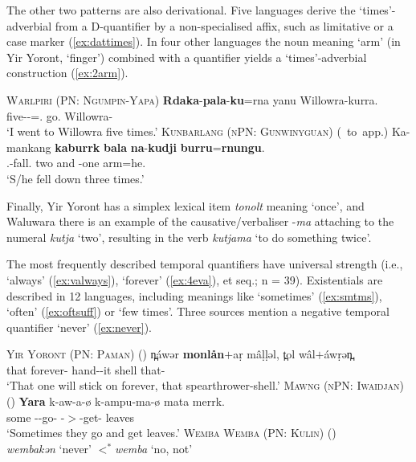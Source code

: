 \documentclass[12pt,egregdoesnotlikesansseriftitles]{scrartcl}
\begin{document}
  The other two patterns are also derivational. Five languages derive the `times'-adverbial from a D-quantifier by a non-specialised affix, such as limitative or a case marker (\ref{ex:dattimes}). In four other languages %
the noun meaning `arm' (in Yir Yoront, `finger') combined with a quantifier %
yields a `times'-adverbial construction (\ref{ex:2arm}).
  
  
  \begin{exe}
  \ex\label{ex:dattimes} \textsc{Warlpiri (PN: Ngumpin-Yapa)}\hfill {}
  \gll \textbf{Rdaka}-\textbf{pala}-\textbf{ku}=rna yanu Willowra-kurra.\\
  five-\Card-\Dat=\Fsg.\Sbj{} go.\Pst{} Willowra-\All\\
  \glt `I went to Willowra five times.'
  \ex\label{ex:2arm} \textsc{Kunbarlang (nPN: Gunwinyguan)} \hfill (\citealt{ikthesis}~to~app.)
  \gll Ka-mankang \textbf{kaburrk} \textbf{bala} \textbf{na}-\textbf{kudji} \textbf{burru}=\textbf{rnungu}.\\
  \Tsg.\Nfut-fall.\Pst{} two and \Cli-one arm=he.\Gen\\
  \glt `S/he fell down three times.' %
\end{exe}

Finally, Yir Yoront has a simplex lexical item \textit{tonolt} meaning `once', and Waluwara there is an example of the causative/verbaliser -\textit{\charis ma} attaching to the numeral \textit{\charis kutja} `two', resulting in the verb \textit{\charis kutjama} `to do something twice'. %

The most frequently described temporal quantifiers have universal strength (i.e., `always' (\ref{ex:valways}), `forever' (\ref{ex:4eva}), et seq.; n = 39). %
Existentials are described in 12 languages, including meanings like `sometimes' (\ref{ex:smtms}), `often' (\ref{ex:oftsuff}) or `few times'. Three sources mention a negative temporal quantifier `never' (\ref{ex:never}).
\begin{exe}
  \ex\label{ex:4eva} \textsc{Yir Yoront (PN: Paman)} \hfill (\citealt[343]{alpher73})
  \gll n̪\'awər \textbf{monlån}$+$a\d{r} m\^a\d{l}\d{l}əl, t̪ol w\^al$+$\'aw\d{r}ən̪.\\
  that forever-\Sel{} hand-\Np-it shell that-\Sub\\
  \glt `That one will stick on forever, that spearthrower-shell.'
  \ex\label{ex:smtms} \textsc{Mawng (nPN: Iwaidjan)} \hfill (\citealt{ngaralk})
  \gll \textbf{Yara} k-aw-a-ø k-ampu-ma-ø mata merrk.\\
  some \Prs-\Tpl-go-\Np{} \Prs-\Tpl$>$\Third\Clveg-get-\Np{} \Clveg{} leaves\\
  \glt `Sometimes they go and get leaves.' %
  \ex\label{ex:never} \textsc{Wemba Wemba (PN: Kulin)} \hfill (\citealt[47]{hercus92})\\
  \textit{\charis wembakən} `never' $<^*$\textit{wemba} `no, not'
\end{exe}
\end{document}
